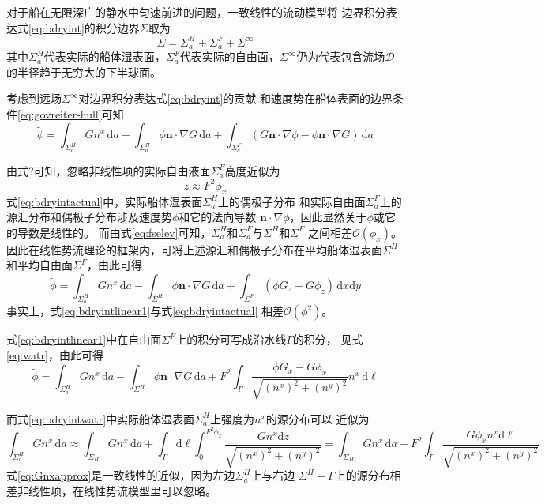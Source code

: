 对于船在无限深广的静水中匀速前进的问题，一致线性的流动模型将
边界积分表达式\eqref{eq:bdryint}的积分边界$\Sigma$取为
\begin{equation}
  \Sigma=\Sigma^H_a+\Sigma^F_a+\Sigma^{\infty}
  \label{eq:bdryactual}
\end{equation}
其中$\Sigma^H_a$代表实际的船体湿表面，$\Sigma^F_a$代表实际的自由面，$\Sigma^{\infty}
$仍为代表包含流场$\mathcal{D}$的半径趋于无穷大的下半球面。

考虑到远场$\Sigma^{\infty}$对边界积分表达式\eqref{eq:bdryint}的贡献
和速度势在船体表面的边界条件\eqref{eq:govreiter-hull}可知
\begin{equation}
  \tilde{\phi}=\int_{\Sigma_a^H}Gn^x\,\mathrm{d}a-\int_{\Sigma_a^H}
  \phi\mathbf{n}\cdot\nabla G\,\mathrm{d}a+\int_{\Sigma_a^F}
  (G\mathbf{n}\cdot\nabla\phi-\phi\mathbf{n}\cdot\nabla G)\,\mathrm{d}a
  \label{eq:bdryintactual}
\end{equation}

由式?可知，忽略非线性项的实际自由液面$\Sigma^F_a$高度近似为
\begin{equation}
  z\approx F^2\phi_x
  \label{eq:fselev}
\end{equation}
式\eqref{eq:bdryintactual}中，实际船体湿表面$\Sigma^H_a$上的偶极子分布
和实际自由面$\Sigma^F_a$上的源汇分布和偶极子分布涉及速度势$\phi$和它的法向导数
$\mathbf{n}\cdot\nabla\phi$，因此显然关于$\phi$或它的导数是线性的。
而由式\eqref{eq:fselev}可知，$\Sigma^H_a$和$\Sigma^F_a$与$\Sigma^H$和$\Sigma^F$
之间相差$\mathcal{O}(\phi_x)$。
因此在线性势流理论的框架内，可将上述源汇和偶极子分布在平均船体湿表面$\Sigma^H$
和平均自由面$\Sigma^F$，由此可得
\begin{equation}
  \tilde{\phi}=\int_{\Sigma_a^H}Gn^x\,\mathrm{d}a-\int_{\Sigma^H}
  \phi\mathbf{n}\cdot\nabla G\,\mathrm{d}a+\int_{\Sigma^F}
  (\phi G_z-G\phi_z)\,\mathrm{d}x\mathrm{d}y
  \label{eq:bdryintlinear1}
\end{equation}
事实上，式\eqref{eq:bdryintlinear1}与式\eqref{eq:bdryintactual}
相差$\mathcal{O}(\phi^2)$。

式\eqref{eq:bdryintlinear1}中在自由面$\Sigma^F$上的积分可写成沿水线$\Gamma$的积分，
见式\eqref{eq:watr}，由此可得
\begin{equation}
  \tilde{\phi}=\int_{\Sigma_a^H}Gn^x\,\mathrm{d}a-\int_{\Sigma^H}
  \phi\mathbf{n}\cdot\nabla G\,\mathrm{d}a+F^2\int_{\Gamma}
  \frac{\phi G_x-G\phi_x}{\sqrt{(n^x)^2+(n^y)^2}}n^x\,\mathrm{d}\ell
  \label{eq:bdryintwatr}
\end{equation}

而式\eqref{eq:bdryintwatr}中实际船体湿表面$\Sigma^H_a$上强度为$n^x$的源分布可以
近似为
\begin{equation}
  \int_{\Sigma_a^H}Gn^x\,\mathrm{d}a\approx\int_{\Sigma_H}Gn^x\,\mathrm{d}a
  +\int_{\Gamma}\mathrm{d}\ell\int_0^{F^2\phi_x}\frac{Gn^x\mathrm{d}z}{\sqrt{(n^x)^2+(n^y)^2}}
  =\int_{\Sigma_H}Gn^x\,\mathrm{d}a+F^2\int_{\Gamma}\frac{G\phi_xn^x\mathrm{d}\ell}{\sqrt{(n^x)^2+(n^y)^2}}
  \label{eq:Gnxapprox}
\end{equation}
式\eqref{eq:Gnxapprox}是一致线性的近似，因为左边$\Sigma^H_a$上与右边
$\Sigma^H+\Gamma$上的源分布相差非线性项，在线性势流模型里可以忽略。

